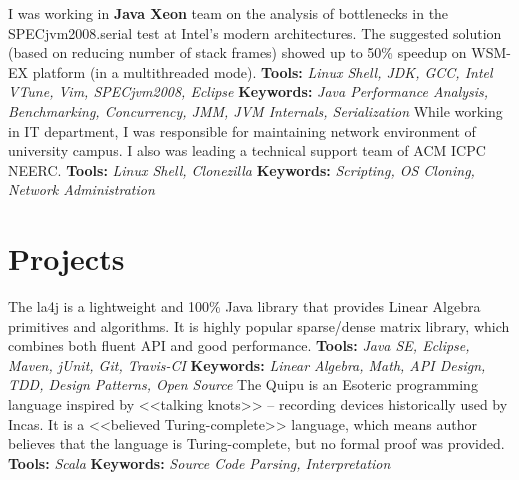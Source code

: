 \documentclass[11pt,a4paper]{moderncv-xetex}
\begin{document}
    {I was working in \textbf{Java Xeon} team on the analysis of bottlenecks in the SPECjvm2008.serial test at Intel’s modern architectures. 
    The suggested solution (based on reducing number of stack frames) showed up to 50\% speedup on WSM-EX platform (in a multithreaded mode).\newline
    \textbf{Tools:} \emph{Linux Shell, JDK, GCC, Intel VTune, Vim, SPECjvm2008, Eclipse}\newline    
    \textbf{Keywords:} \emph{Java Performance Analysis, Benchmarking, Concurrency, JMM, JVM Internals, Serialization}\newline
    }
    {While working in IT department, I was responsible for maintaining network environment of university campus. I also was leading a 
    technical support team of ACM ICPC NEERC.\newline
    \textbf{Tools:} \emph{Linux Shell, Clonezilla}\newline
    \textbf{Keywords:} \emph{Scripting, OS Cloning, Network Administration}
    }

\section{Projects}
    {The la4j is a lightweight and 100\% Java library that provides Linear Algebra primitives and algorithms. It is highly popular 
    sparse/dense matrix library, which combines both fluent API and good performance.\newline
    \textbf{Tools:} \emph{Java SE, Eclipse, Maven, jUnit, Git, Travis-CI}\newline
    \textbf{Keywords:} \emph{Linear Algebra, Math, API Design, TDD, Design Patterns, Open Source}\newline
    }
    {The Quipu is an Esoteric programming language inspired by <<talking knots>> – recording devices historically used by Incas.
    It is a <<believed Turing-complete>> language, which means author believes that the language is Turing-complete, but no formal proof was provided.\newline
    \textbf{Tools:} \emph{Scala}\newline
    \textbf{Keywords:} \emph{Source Code Parsing, Interpretation}
    }
\end{document}
